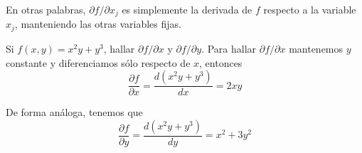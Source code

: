 En otras palabras, $\partial f / \partial x_{j}$ es simplemente la derivada de $f$ respecto a la variable $x_{j}$, manteniendo las otras variables fijas.

\begin{myExample}
    Si $f(x,y) = x^{2}y+y^{3}$, hallar $\partial f / \partial x$ y $\partial f / \partial y$.
    Para hallar $\partial f / \partial x$ mantenemos $y$ constante y diferenciamos sólo respecto de $x$, entonces
    $$ \frac{\partial f}{\partial x} = \frac{d(x^{2}y+y^{3})}{dx} = 2xy $$

    De forma análoga, tenemos que
    $$ \frac{\partial f}{\partial y} = \frac{d(x^{2}y+y^{3})}{dy} = x^{2} + 3y^{2} $$
\end{myExample}
